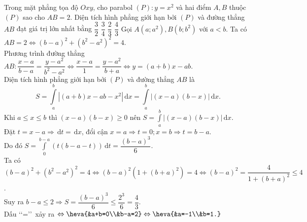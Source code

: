\begin{ex}%
Trong mặt phẳng tọa độ $Oxy$, cho parabol $(P)\colon y =x^2$ và hai điểm $A, B$ thuộc $(P)$ sao cho
$AB= 2$. Diện tích hình phẳng giới hạn bởi $(P)$ và đường thẳng $AB$ đạt giá trị lớn nhất bằng
\choice
{$\dfrac{3}{2}$}
{$\dfrac{3}{4}$}
{$\dfrac{2}{3}$}
{\True $\dfrac{4}{3}$}
\loigiai
{Gọi $A(a;a^2), B(b;b^2)$ với $a<b$. Ta có $AB=2\Leftrightarrow (b-a)^2+(b^2-a^2)^2=4$.\\
Phương trình đường thẳng $AB\colon\dfrac{x-a}{b-a}=\dfrac{y-a^2}{b^2-a^2}\Leftrightarrow\dfrac{x-a}{1}=\dfrac{y-a^2}{b+a}\Leftrightarrow y = (a+b)x-ab.$\\
Diện tích hình phẳng giới hạn bởi $(P)$ và đường thẳng $AB$ là
$$S= \displaystyle\int\limits_a^b |(a+b)x-ab-x^2|\mathrm{\,d}x = \displaystyle\int\limits_a^b |(x-a)(b-x)|\mathrm{\,d}x.$$
Khi $a\leq x \leq b$ thì $(x-a)(b-x)\geq 0$ nên $S= \displaystyle\int\limits_a^b |(x-a)(b-x)|\mathrm{\,d}x$. \\
Đặt $t = x-a\Rightarrow \mathrm{\,d}t=\mathrm{\,d}x$, đổi cận $x=a\Rightarrow t=0; x=b \Rightarrow t = b-a$.\\
Do đó $S= \displaystyle\int\limits_0^{b-a} \left(t(b-a-t)\right)\mathrm{\,d}t=\dfrac{(b-a)^3}{6}.$\\
Ta có $(b-a)^2+(b^2-a^2)^2=4\Leftrightarrow(b-a)^2(1+(b+a)^2)=4\Leftrightarrow(b-a)^2=\dfrac{4}{1+(b+a)^2}\leq 4$.\\
Suy ra $b-a \leq 2 \Rightarrow S = \dfrac{(b-a)^3}{6}\leq \dfrac{2^3}{6}=\dfrac{4}{3}.$\\
Dấu \lq\lq=\rq\rq\, xảy ra $\Leftrightarrow\heva{&a+b=0\\&b-a=2}\Leftrightarrow \heva{&a=-1\\&b=1.}$
}
\end{ex}

